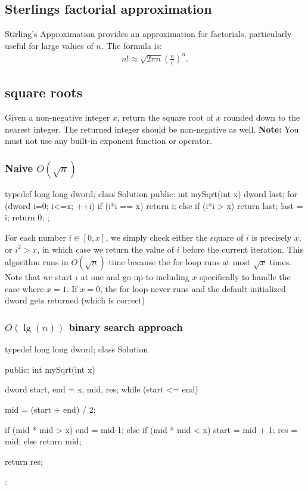\documentclass{report}
\begin{document}
\bigbreak \noindent 
\subsection{Sterlings factorial approximation}
\bigbreak \noindent 
Stirling's Approximation provides an approximation for factorials, particularly useful for large values of $n$. The formula is:
\begin{align*}
    n! \approx  \sqrt{2\pi n}\left(\frac{n}{e}\right)^{n}
.\end{align*}

\bigbreak \noindent 
\subsection{square roots}
\bigbreak \noindent 
Given a non-negative integer $x$, return the square root of $x$ rounded down to the nearest integer. The returned integer should be non-negative as well.
\bigbreak \noindent 
\textbf{Note:} You must not use any built-in exponent function or operator.
\bigbreak \noindent 
\subsubsection{Naive $O(\sqrt{n})$}
\bigbreak \noindent 
\begin{cppcode}
    typedef long long dword; 
    class Solution {
        public:
        int mySqrt(int x) {
            dword last{};
            for (dword i=0; i<=x; ++i) {
                if (i*i == x) return i;
                else if (i*i > x) return last;
                last = i;
            }
            return 0;
        }
    };
\end{cppcode}
\bigbreak \noindent 
For each number $i \in [0,x]$, we simply check either the square of $i$ is precisely $x$, or $i^{2}> x$, in which case we return the value of $i$ before the current iteration.
\bigbreak \noindent 
This algorithm runs in $O(\sqrt{n})$ time because the for loop runs at most $\sqrt{x}$ times.
\bigbreak \noindent 
Note that we start $i$ at one and go up to including $x$ specifically to handle the case where $x=1$. If $x=0$, the for loop never runs and the default initialized dword gets returned (which is correct)
\bigbreak \noindent 
\subsubsection{$O(\lg(n))$ binary search approach}
\bigbreak \noindent 
\begin{cppcode}
    typedef long long dword;
    class Solution {
        public:
        int mySqrt(int x) {
            dword start{}, end = x, mid, res;
            while (start <= end) {
                mid = (start + end) / 2;

                if (mid * mid > x) {
                    end = mid-1;
                } else if (mid * mid < x) {
                    start = mid + 1;
                    res = mid;
                } else {
                    return mid;
                }
            }
            return res;
        }
    };
\end{cppcode}
\end{document}
